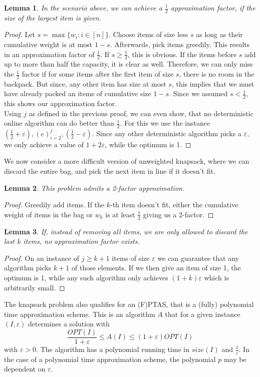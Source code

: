\documentclass[a4paper, 12pt]{article}
\newtheorem{lemma}{Lemma}[section]
\begin{document}
	\begin{lemma}
		In the scenario above, we can achieve a $\frac{1}{2}$ approximation factor, if the size of the largest item is given.
	\end{lemma}
	\begin{proof}
		Let $s = \max\{w_i: i \in [n]\}$. Choose items of size less $s$ as long as their cumulative weight is at most $1-s$. Afterwards, pick items greedily. This results in an approximation factor of $\frac{1}{2}$. If $s \geq \frac{1}{2}$, this is obvious. If the items before $s$ add up to more than half the capacity, it is clear as well. Therefore, we can only miss the $\frac{1}{2}$ factor if for some items after the first item of size $s$, there is no room in the backpack. But since, any other item has size at most $s$, this implies that we must have already packed an items of cumulative size $1-s$. Since we assumed $s < \frac{1}{2}$, this shows our approximation factor.\\
		Using $j$ as defined in the previous proof, we can even show, that no deterministic online algorithm can do better than $\frac{1}{2}$. For this we use the instance $(\frac{1}{2} + \varepsilon), (e)_{i=2}^j, (\frac{1}{2} - \varepsilon)$. Since any other deterministic algorithm picks a $\varepsilon$, we only achieve a value of $1+2\varepsilon$, while the optimum is 1.
	\end{proof}
	We now consider a more difficult version of unweighted knapsack, where we can discard the entire bag, and pick the next item in line if it doesn't fit.
	\begin{lemma}
		This problem admits a 2-factor approximation.
	\end{lemma}
	\begin{proof}
		Greedily add items. If the $k$-th item doesn't fit, either the cumulative weight of items in the bag or $w_k$ is at least $\frac{1}{2}$ giving us a 2-factor.
	\end{proof}
	\begin{lemma}
		If, instead of removing all items, we are only allowed to discard the last $k$ items, no approximation factor exists.
	\end{lemma}
	\begin{proof}
		On an instance of $j \geq k+1$ items of size $\varepsilon$ we can guarantee that any algorithm picks $k+1$ of those elements. If we then give an item of size 1, the optimum is 1, while any such algorithm only achieves $(1+k)\varepsilon$ which is arbitrarily small.
	\end{proof}
	The knapsack problem also qualifies for an (F)PTAS, that is a (fully) polynomial time approximation scheme. This is an algorithm $A$ that for a given instance $(I, \varepsilon)$ determines a solution with \[\frac{OPT(I)}{1+\varepsilon} \leq A(I) \leq (1+\varepsilon)OPT(I)\] with $\varepsilon > 0$. The algorithm has a polynomial running time in $size(I)$ and $\frac{1}{\varepsilon}$. In the case of a polynomial time approximation scheme, the polynomial $p$ may be dependent on $\varepsilon$.
\end{document}
